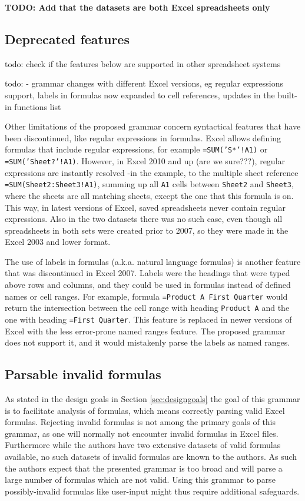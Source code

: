 \documentclass[conference]{IEEEtran}
\newcommand{\todo}[1]{\textbf{TODO: #1}}
\begin{document}
\todo{Add that the datasets are both Excel spreadsheets only}

\subsection{Deprecated features}
todo: check if the features below are supported in other spreadsheet systems

todo: - grammar changes with different Excel versions, eg regular expressions support, labels in formulas now expanded to cell
references, updates in the built-in functions list

Other limitations of the proposed grammar concern syntactical features that have been discontinued, like regular expressions in formulas. Excel allows defining formulas that include regular expressions, for example \texttt{=SUM('S*'!A1)} or \texttt{=SUM('Sheet?'!A1)}. However, in Excel 2010 and up (are we sure???), regular expressions are instantly resolved -in the example, to the multiple sheet reference \texttt{=SUM(Sheet2:Sheet3!A1)}, summing up all \texttt{A1} cells between \texttt{Sheet2} and \texttt{Sheet3}, where the sheets are all matching sheets, except the one that this formula is on. This way, in latest versions of Excel, saved spreadsheets never contain regular expressions. Also in the two datasets there was no such case, even though all spreadsheets in both sets were created prior to 2007, so they were made in the Excel 2003 and lower format. 

The use of labels in formulas (a.k.a. natural language formulas) is another feature that was discontinued in Excel 2007. Labels were the headings that were typed above rows and columns, and they could be used in formulas instead of defined names or cell ranges. For example, formula \texttt{=Product A First Quarter} would return the intersection between the cell range with heading \texttt{Product A} and the one with heading \texttt{=First Quarter}. This feature is replaced in newer versions of Excel with the less error-prone named ranges feature. The proposed grammar does not support it, and it would mistakenly parse the labels as named ranges.

\subsection{Parsable invalid formulas}

As stated in the design goals in Section \ref{sec:designgoals} the goal of this grammar is to facilitate analysis of formulas, which means correctly parsing valid Excel formulas.
Rejecting invalid formulas is not among the primary goals of this grammar, as one will normally not encounter invalid formulas in Excel files.
Furthermore while the authors have two extensive datasets of valid formulas available, no such datasets of invalid formulas are known to the authors.
As such the authors expect that the presented grammar is too broad and will parse a large number of formulas which are not valid.
Using this grammar to parse possibly-invalid formulas like user-input might thus require additional safeguards.
\end{document}
